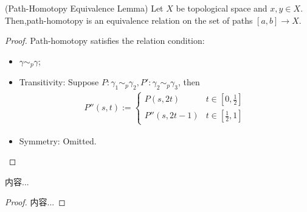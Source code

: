 \documentclass[Total.tex]{subfiles}
\begin{document}
	\begin{lemma}
		(Path-Homotopy Equivalence Lemma) Let $X$ be topological space and $x,y\in X$. Then,path-homotopy is an equivalence relation on the set of paths $[a,b]\rightarrow X$.
	\end{lemma}
	\begin{proof}
		Path-homotopy satisfies the relation condition:
		\begin{itemize}
			\item $\gamma\sim_{p} \gamma$;
			\item Transitivity: Suppose $P:\gamma_1\sim_p \gamma_2,P':\gamma_2\sim_p \gamma_3$, then
			\begin{gather*}
				P''(s,t):=\begin{cases}
					P(s,2t)&t\in [0,\frac{1}{2}]\\
					P''(s,2t-1)&t\in [\frac{1}{2},1]
				\end{cases}
			\end{gather*}
			\item Symmetry: Omitted.
		\end{itemize}
	\end{proof}
	
	\begin{proposition}
		内容...
	\end{proposition}
	\begin{proof}
		内容...
	\end{proof}
	
\end{document}
